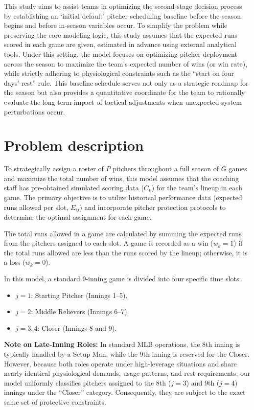\documentclass[11pt, a4paper]{article}
\begin{document}
This study aims to assist teams in optimizing the second-stage decision process by establishing an `initial default' pitcher scheduling baseline before the season begins and before in-season variables occur.
To simplify the problem while preserving the core modeling logic, this study assumes that the expected runs scored in each game are given, estimated in advance using external analytical tools.
Under this setting, the model focuses on optimizing pitcher deployment across the season to maximize the team's expected number of wins (or win rate), while strictly adhering to physiological constraints such as the “start on four days’ rest” rule.
This baseline schedule serves not only as a strategic roadmap for the season but also provides a quantitative coordinate for the team to rationally evaluate the long-term impact of tactical adjustments when unexpected system perturbations occur.

\section{Problem description}

To strategically assign a roster of $P$ pitchers throughout a full season of $G$ games and maximize the total number of wins, this model assumes that the coaching staff has pre-obtained simulated scoring data ($C_k$) for the team's lineup in each game. The primary objective is to utilize historical performance data (expected runs allowed per slot, $E_{ij}$) and incorporate pitcher protection protocols to determine the optimal assignment for each game.

The total runs allowed in a game are calculated by summing the expected runs from the pitchers assigned to each slot. A game is recorded as a win ($w_k = 1$) if the total runs allowed are less than the runs scored by the lineup; otherwise, it is a loss ($w_k = 0$).

In this model, a standard 9-inning game is divided into four specific time slots:
\begin{itemize}
    \item $j=1$: Starting Pitcher (Innings 1--5).
    \item $j=2$: Middle Relievers (Innings 6--7).
    \item $j=3, 4$: Closer (Innings 8 and 9).
\end{itemize}


\textbf{Note on Late-Inning Roles:} In standard MLB operations, the 8th inning is typically handled by a Setup Man, while the 9th inning is reserved for the Closer. However, because both roles operate under high-leverage situations and share nearly identical physiological demands, usage patterns, and rest requirements, our model uniformly classifies pitchers assigned to the 8th ($j=3$) and 9th ($j=4$) innings under the ``Closer'' category. Consequently, they are subject to the exact same set of protective constraints.
\end{document}
